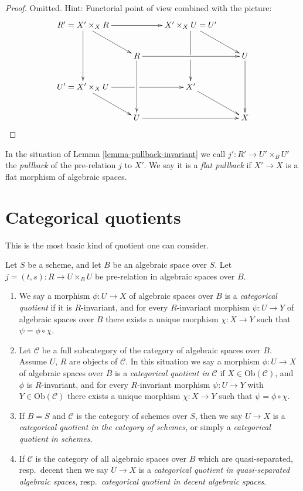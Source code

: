 \begin{proof}
Omitted. Hint: Functorial point of view combined with the picture:
$$
\xymatrix{
R' = X' \times_X R \ar[dd] \ar[rr] \ar[rd] &&
X' \times_X U = U' \ar'[d][dd] \ar[rd] \\
& R \ar[dd] \ar[rr] && U \ar[dd] \\
U' = X' \times_X U \ar'[r][rr] \ar[rd] && X' \ar[rd] \\
& U \ar[rr] && X
}
$$
\end{proof}

\begin{definition}
\label{definition-pullback}
In the situation of
Lemma \ref{lemma-pullback-invariant}
we call $j' : R' \to U' \times_B U'$ the {\it pullback} of the pre-relation
$j$ to $X'$. We say it is a {\it flat pullback} if $X' \to X$ is a flat
morphism of algebraic spaces.
\end{definition}





\section{Categorical quotients}
\label{section-categorical}

\noindent
This is the most basic kind of quotient one can consider.

\begin{definition}
\label{definition-categorical}
Let $S$ be a scheme, and let $B$ be an algebraic space over $S$.
Let $j = (t, s) : R \to U \times_B U$ be pre-relation in algebraic spaces
over $B$.
\begin{enumerate}
\item We say a morphism $\phi : U \to X$ of algebraic spaces over $B$
is a {\it categorical quotient} if it is $R$-invariant, and
for every $R$-invariant morphism $\psi : U \to Y$ of algebraic spaces over $B$
there exists a unique morphism $\chi : X \to Y$ such that
$\psi = \phi \circ \chi$.
\item Let $\mathcal{C}$ be a full subcategory of the category of algebraic
spaces over $B$. Assume $U$, $R$ are objects of $\mathcal{C}$.
In this situation we say
a morphism $\phi : U \to X$ of algebraic spaces over $B$
is a {\it categorical quotient in $\mathcal{C}$}
if $X \in \text{Ob}(\mathcal{C})$, and $\phi$ is $R$-invariant,
and for every $R$-invariant morphism
$\psi : U \to Y$ with $Y \in \text{Ob}(\mathcal{C})$
there exists a unique morphism $\chi : X \to Y$ such
that $\psi = \phi \circ \chi$.
\item If $B = S$ and $\mathcal{C}$ is the category of schemes over $S$,
then we say $U \to X$ is a
{\it categorical quotient in the category of schemes}, or simply a
{\it categorical quotient in schemes}.
\item If $\mathcal{C}$ is the category of all algebraic spaces over $B$
which are quasi-separated, resp.\ decent then we say $U \to X$ is a
{\it categorical quotient in quasi-separated algebraic spaces},
resp.\ {\it categorical quotient in decent algebraic spaces}.
\end{enumerate}
\end{definition}


